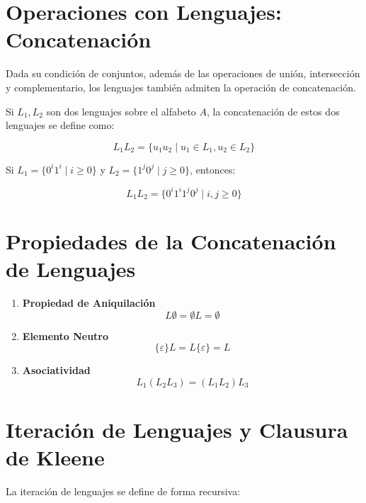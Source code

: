\documentclass[12pt]{book} %
\begin{document}
\hypertarget{operaciones-con-lenguajes-concatenaciuxf3n}{%
\section{Operaciones con Lenguajes:
Concatenación}\label{operaciones-con-lenguajes-concatenaciuxf3n}}

Dada su condición de conjuntos, además de las operaciones de unión,
intersección y complementario, los lenguajes también admiten la
operación de concatenación.

Si \(L_1, L_2\) son dos lenguajes sobre el alfabeto \(A\), la
concatenación de estos dos lenguajes se define como:

\[
L_1L_2 = \{u_1u_2 \mid u_1 \in L_1, u_2 \in L_2\}
\]

\begin{ejemplo}
Si $L_1 = \{0^i1^i \mid i \geq 0\}$ y $L_2 = \{1^j0^j \mid j \geq 0\}$, entonces:

$$
L_1L_2 = \{0^i1^i1^j0^j \mid i, j \geq 0\}
$$
\end{ejemplo}

\hypertarget{propiedades-de-la-concatenaciuxf3n-de-lenguajes}{%
\section{Propiedades de la Concatenación de
Lenguajes}\label{propiedades-de-la-concatenaciuxf3n-de-lenguajes}}

\begin{enumerate}
\def\labelenumi{\arabic{enumi}.}
\item
  \textbf{Propiedad de Aniquilación}\\
  \[L \emptyset = \emptyset L = \emptyset\]
\item
  \textbf{Elemento Neutro}\\
  \[\{\varepsilon\}L = L\{\varepsilon\} = L\]
\item
  \textbf{Asociatividad}\\
  \[L_1(L_2L_3) = (L_1L_2)L_3\]
\end{enumerate}

\hypertarget{iteraciuxf3n-de-lenguajes-y-clausura-de-kleene}{%
\section{Iteración de Lenguajes y Clausura de
Kleene}\label{iteraciuxf3n-de-lenguajes-y-clausura-de-kleene}}

La iteración de lenguajes se define de forma recursiva:
\end{document}
